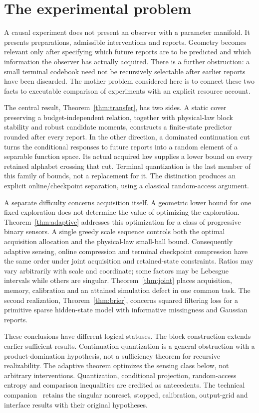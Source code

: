 \section{The experimental problem}\label{sec:problem}
A causal experiment does not present an observer with a parameter manifold. It presents preparations, admissible interventions and reports. Geometry becomes relevant only after specifying which future reports are to be predicted and which information the observer has actually acquired. There is a further obstruction: a small terminal codebook need not be recursively selectable after earlier reports have been discarded. The mother problem considered here is to connect these two facts to executable comparison of experiments with an explicit resource account.

The central result, Theorem~\ref{thm:transfer}, has two sides. A static cover preserving a budget-independent relation, together with physical-law block stability and robust candidate moments, constructs a finite-state predictor rounded after every report. In the other direction, a dominated continuation cut turns the conditional responses to future reports into a random element of a separable function space. Its actual acquired law supplies a lower bound on every retained alphabet crossing that cut. Terminal quantization is the last member of this family of bounds, not a replacement for it. The distinction produces an explicit online/checkpoint separation, using a classical random-access argument.

A separate difficulty concerns acquisition itself. A geometric lower bound for one fixed exploration does not determine the value of optimizing the exploration. Theorem~\ref{thm:adaptive} addresses this optimization for a class of progressive binary sensors. A single greedy scale sequence controls both the optimal acquisition allocation and the physical-law small-ball bound. Consequently adaptive sensing, online compression and terminal checkpoint compression have the same order under joint acquisition and retained-state constraints. Ratios may vary arbitrarily with scale and coordinate; some factors may be Lebesgue intervals while others are singular. Theorem~\ref{thm:joint} places acquisition, memory, calibration and an attained simulation defect in one common task. The second realization, Theorem~\ref{thm:brier}, concerns squared filtering loss for a primitive sparse hidden-state model with informative missingness and Gaussian reports.

These conclusions have different logical statuses. The block construction extends earlier sufficient results. Continuation quantization is a general obstruction with a product-domination hypothesis, not a sufficiency theorem for recursive realizability. The adaptive theorem optimizes the sensing class below, not arbitrary interventions. Quantization, conditional projection, random-access entropy and comparison inequalities are credited as antecedents. The technical companion~\cite{companion} retains the singular nonreset, stopped, calibration, output-grid and interface results with their original hypotheses.

